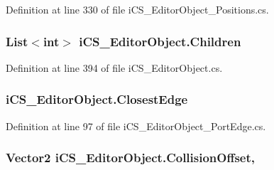Definition at line 330 of file i\+C\+S\+\_\+\+Editor\+Object\+\_\+\+Positions.\+cs.

\hypertarget{classi_c_s___editor_object_a32b9a56c02c9f025bcc66c52180895a0}{
\subsubsection[{Children}]{\setlength{\rightskip}{0pt plus 5cm}List$<$int$>$ i\+C\+S\+\_\+\+Editor\+Object.\+Children\hspace{0.3cm}{\ttfamily [get]}}}\label{classi_c_s___editor_object_a32b9a56c02c9f025bcc66c52180895a0}


Definition at line 394 of file i\+C\+S\+\_\+\+Editor\+Object.\+cs.

\hypertarget{classi_c_s___editor_object_a54f9005bb1b87cdb28fa52bfa4e93135}{
\subsubsection[{Closest\+Edge}]{ i\+C\+S\+\_\+\+Editor\+Object.\+Closest\+Edge\hspace{0.3cm}{\ttfamily [get]}}}\label{classi_c_s___editor_object_a54f9005bb1b87cdb28fa52bfa4e93135}


Definition at line 97 of file i\+C\+S\+\_\+\+Editor\+Object\+\_\+\+Port\+Edge.\+cs.

\hypertarget{classi_c_s___editor_object_af72e3d5b31ec5c94183e59fa77cde000}{
\subsubsection[{Collision\+Offset}]{\setlength{\rightskip}{0pt plus 5cm}Vector2 i\+C\+S\+\_\+\+Editor\+Object.\+Collision\+Offset\hspace{0.3cm}{\ttfamily [get]}, {\ttfamily [set]}}}\label{classi_c_s___editor_object_af72e3d5b31ec5c94183e59fa77cde000}


